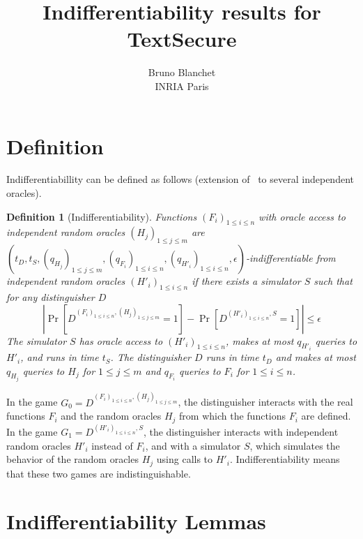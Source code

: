 \documentclass[compsoc, conference, letterpaper, 10pt, times]{IEEEtran}
\newtheorem{definition}{Definition}
\begin{document}
\title{Indifferentiability results for TextSecure}
\author{
{\rm Bruno Blanchet}\\
INRIA Paris
}

\maketitle
\thispagestyle{plain}
\pagestyle{plain}

\section{Definition}

Indifferentiabillity can be defined as follows (extension of~\cite{Coron05}
to several independent oracles).

\begin{definition}[Indifferentiability]
Functions $(F_i)_{1 \leq i \leq n}$ with oracle access to independent random oracles $(H_j)_{1 \leq j \leq m}$ are $(t_D, t_S, (q_{H_j})_{1 \leq j \leq m}, (q_{F_i})_{1 \leq i \leq n}, (q_{H'_i})_{1 \leq i \leq n}, \epsilon)$-indifferentiable from independent random oracles $(H'_i)_{1 \leq i \leq n}$ if there exists a simulator $S$ such that for any distinguisher $D$ 
\[|\Pr[D^{(F_i)_{1 \leq i \leq n},(H_j)_{1 \leq j \leq m}} =1] - \Pr[D^{(H'_i)_{1 \leq i \leq n},S}=1]| \leq \epsilon\]
The simulator $S$ has oracle access to
$(H'_i)_{1 \leq i \leq n}$, makes at most $q_{H'_i}$ queries to $H'_i$,
and runs in time $t_S$. 
The distinguisher $D$ runs in time $t_D$ and makes at most $q_{H_j}$ queries
to $H_j$ for $1 \leq j \leq m$ and $q_{F_i}$ queries to $F_i$ for
$1 \leq i \leq n$.
\end{definition}

In the game $G_0 = D^{(F_i)_{1 \leq i \leq n},(H_j)_{1 \leq j \leq m}}$,
the distinguisher interacts with the real functions $F_i$ and
the random oracles $H_j$ from which the functions $F_i$ are defined.
In the game $G_1 = D^{(H'_i)_{1 \leq i \leq n},S}$,
the distinguisher interacts with independent random oracles $H'_i$ instead of $F_i$, and with a simulator $S$, which simulates the behavior of the random oracles $H_j$ using calls to $H'_i$. Indifferentiability means that these two games are indistinguishable.

\section{Indifferentiability Lemmas}
\end{document}
